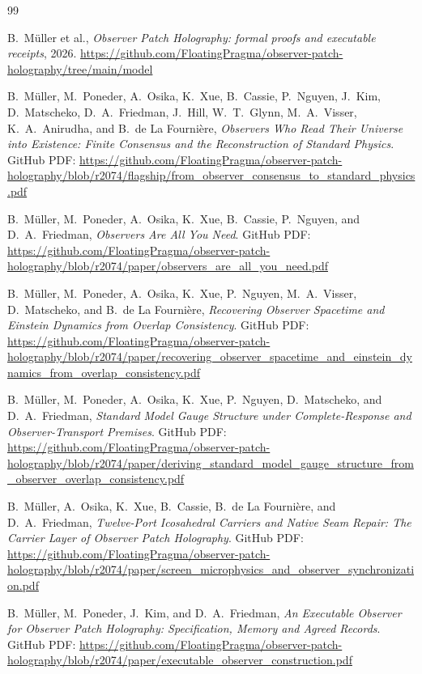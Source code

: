 \documentclass[11pt]{article}
\begin{document}
\begin{thebibliography}{99}

B.\ M\"uller et al.,
\emph{Observer Patch Holography: formal proofs and executable receipts},
2026.
\url{https://github.com/FloatingPragma/observer-patch-holography/tree/main/model}

B.\ M\"uller, M.\ Poneder, A.\ Osika, K.\ Xue, B.\ Cassie, P.\ Nguyen, J.\ Kim,
D.\ Matscheko, D.\ A.\ Friedman, J.\ Hill, W.\ T.\ Glynn, M.\ A.\ Visser, K.\ A.\ Anirudha, and B.\ de La Fourni\`ere,
\emph{Observers Who Read Their Universe into Existence: Finite Consensus and the Reconstruction of Standard Physics}.
GitHub PDF:
\url{https://github.com/FloatingPragma/observer-patch-holography/blob/r2074/flagship/from_observer_consensus_to_standard_physics.pdf}

B.\ M\"uller, M.\ Poneder, A.\ Osika, K.\ Xue, B.\ Cassie, P.\ Nguyen, and D.\ A.\ Friedman,
\emph{Observers Are All You Need}.
GitHub PDF:
\url{https://github.com/FloatingPragma/observer-patch-holography/blob/r2074/paper/observers_are_all_you_need.pdf}

B.\ M\"uller, M.\ Poneder, A.\ Osika, K.\ Xue, P.\ Nguyen, M.\ A.\ Visser, D.\ Matscheko, and B.\ de La Fourni\`ere,
\emph{Recovering Observer Spacetime and Einstein Dynamics from Overlap Consistency}.
GitHub PDF:
\url{https://github.com/FloatingPragma/observer-patch-holography/blob/r2074/paper/recovering_observer_spacetime_and_einstein_dynamics_from_overlap_consistency.pdf}

B.\ M\"uller, M.\ Poneder, A.\ Osika, K.\ Xue, P.\ Nguyen, D.\ Matscheko, and D.\ A.\ Friedman,
\emph{Standard Model Gauge Structure under Complete-Response and Observer-Transport Premises}.
GitHub PDF:
\url{https://github.com/FloatingPragma/observer-patch-holography/blob/r2074/paper/deriving_standard_model_gauge_structure_from_observer_overlap_consistency.pdf}

B.\ M\"uller, A.\ Osika, K.\ Xue, B.\ Cassie, B.\ de La Fourni\`ere, and D.\ A.\ Friedman,
\emph{Twelve-Port Icosahedral Carriers and Native Seam Repair: The Carrier Layer of Observer Patch Holography}.
GitHub PDF:
\url{https://github.com/FloatingPragma/observer-patch-holography/blob/r2074/paper/screen_microphysics_and_observer_synchronization.pdf}

B.\ M\"uller, M.\ Poneder, J.\ Kim, and D.\ A.\ Friedman,
\emph{An Executable Observer for Observer Patch Holography: Specification, Memory and Agreed Records}.
GitHub PDF:
\url{https://github.com/FloatingPragma/observer-patch-holography/blob/r2074/paper/executable_observer_construction.pdf}


\end{thebibliography}
\end{document}
